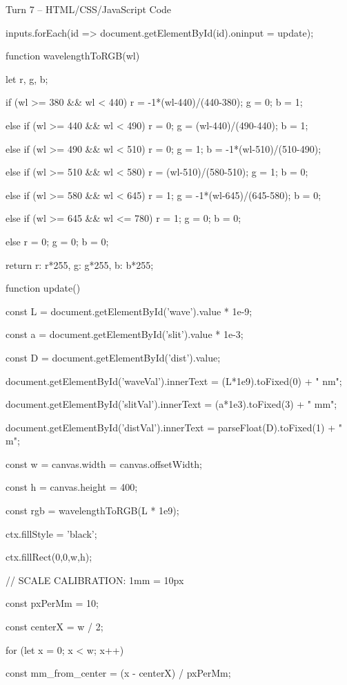 \documentclass[10pt,a4paper]{article}
\begin{document}
\begin{htmlcodebox}{Turn 7 -- HTML/CSS/JavaScript Code}
{{{inputs.forEach(id => document.getElementById(id).oninput = update);

function wavelengthToRGB(wl) {

    let r, g, b;

    if (wl >= 380 && wl < 440) { r = -1*(wl-440)/(440-380); g = 0; b = 1; }

    else if (wl >= 440 && wl < 490) { r = 0; g = (wl-440)/(490-440); b = 1; }

    else if (wl >= 490 && wl < 510) { r = 0; g = 1; b = -1*(wl-510)/(510-490); }

    else if (wl >= 510 && wl < 580) { r = (wl-510)/(580-510); g = 1; b = 0; }

    else if (wl >= 580 && wl < 645) { r = 1; g = -1*(wl-645)/(645-580); b = 0; }

    else if (wl >= 645 && wl <= 780) { r = 1; g = 0; b = 0; }

    else { r = 0; g = 0; b = 0; }

    return {r: r*255, g: g*255, b: b*255};

}

function update() {


    const L = document.getElementById('wave').value * 1e-9;

    const a = document.getElementById('slit').value * 1e-3;

    const D = document.getElementById('dist').value;

    document.getElementById('waveVal').innerText = (L*1e9).toFixed(0) + " nm";

    document.getElementById('slitVal').innerText = (a*1e3).toFixed(3) + " mm";

    document.getElementById('distVal').innerText = parseFloat(D).toFixed(1) + " m";

    const w = canvas.width = canvas.offsetWidth;

    const h = canvas.height = 400;

    const rgb = wavelengthToRGB(L * 1e9);

    ctx.fillStyle = 'black';

    ctx.fillRect(0,0,w,h);

    // SCALE CALIBRATION: 1mm = 10px

    const pxPerMm = 10;

    const centerX = w / 2;

    for (let x = 0; x < w; x++) {

        const mm_from_center = (x - centerX) / pxPerMm;

}}}}}
\end{htmlcodebox}
\end{document}
